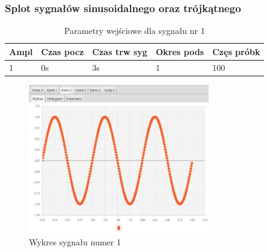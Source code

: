 \documentclass[12pt]{article}
\begin{document}
{{            \subsubsection{Splot sygnałów sinusoidalnego oraz trójkątnego} \label{eksperyment:splot3}{

                \begin{table}[H]
                    \centering
                    \begin{tabular}{|l|l|l|l|l|}
                        \hline
                        Ampl & Czas pocz & Czas trw syg & Okres pods & Częs próbk   \\ \hline
                        1 & 0s & 3s & 1 & 100           \\ \hline
                    \end{tabular}
                    \caption{Parametry wejściowe dla sygnału nr 1}
                \end{table}
                \begin{figure}[H]
                    \centering
                    \includegraphics[width=0.7\textwidth]{img/result/convolution/experiment3/data_124714.png}
                    \caption{Wykres sygnału numer 1}
                \end{figure}

}}}
\end{document}

